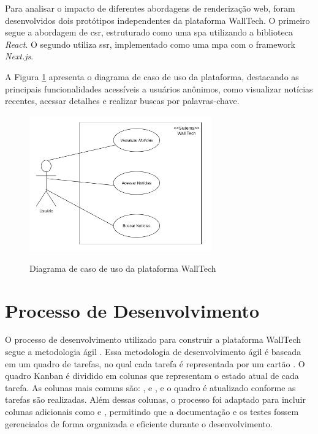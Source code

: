 Para analisar o impacto de diferentes abordagens de renderização web, foram desenvolvidos dois protótipos independentes da plataforma WallTech. O primeiro segue a abordagem de \acrfull{csr}, estruturado como uma \acrfull{spa} utilizando a biblioteca \textit{React}. O segundo utiliza \acrfull{ssr}, implementado como uma \acrfull{mpa} com o framework \textit{Next.js}.

A Figura \ref{fig:caso-uso-walltech} apresenta o diagrama de caso de uso da plataforma, destacando as principais funcionalidades acessíveis a usuários anônimos, como visualizar notícias recentes, acessar detalhes e realizar buscas por palavras-chave.

\begin{figure}[H]
  \centering
  \caption{Diagrama de caso de uso da plataforma WallTech}
  \includegraphics[width=0.7\textwidth]{media/wall_tech_use_case.png}
  \label{fig:caso-uso-walltech}
\end{figure}


\section{Processo de Desenvolvimento}
\label{section:processo-desenvolvimento}
O processo de desenvolvimento utilizado para construir a plataforma WallTech segue a metodologia ágil . Essa metodologia de desenvolvimento ágil é baseada em um quadro de tarefas, no qual cada tarefa é representada por um cartão \cite{gomes2014kanban}. O quadro Kanban é dividido em colunas que representam o estado atual de cada tarefa. As colunas mais comuns são: ,  e , e o quadro é atualizado conforme as tarefas são realizadas. Além dessas colunas, o processo foi adaptado para incluir colunas adicionais como  e , permitindo que a documentação e os testes fossem gerenciados de forma organizada e eficiente durante o desenvolvimento.

